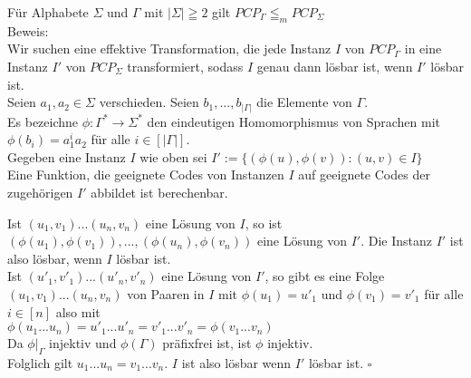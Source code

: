\begin{lemma}{}
    Für Alphabete $\Sigma$ und $\Gamma$ mit $|\Sigma| \geqq 2$ gilt $PCP_{\Gamma} \leqq_m PCP_{\Sigma}$ \\

    Beweis: \\
    Wir suchen eine effektive Transformation, die jede Instanz $I$ von $PCP_\Gamma$ in eine Instanz $I'$ von
    $PCP_\Sigma$ transformiert, sodass $I$ genau dann lösbar ist, wenn $I'$ lösbar ist. \\

    Seien $a_1,a_2 \in \Sigma$ verschieden. Seien $b_1,...,b_{|\Gamma|}$ die Elemente von $\Gamma$. \\
    Es bezeichne $\phi : \Gamma^* \rightarrow \Sigma^*$ den eindeutigen Homomorphismus von Sprachen mit
    $\phi(b_i) = a_1^i a_2$ für alle $i \in [|\Gamma|]$. \\

    Gegeben eine Instanz $I$ wie oben sei $I':=\{(\phi(u),\phi(v)):(u,v) \in I\}$ \\
    Eine Funktion, die geeignete Codes von Instanzen $I$ auf geeignete Codes der zugehörigen $I'$ abbildet
    ist berechenbar.
    
    Ist $(u_1,v_1)...(u_n,v_n)$ eine Lösung von $I$, so ist $(\phi(u_1),\phi(v_1)),...,(\phi(u_n),\phi(v_n))$
    eine Lösung von $I'$. Die Instanz $I'$ ist also lösbar, wenn $I$ lösbar ist. \\

    Ist $(u'_1,v'_1)...(u'_n,v'_n)$ eine Lösung von $I'$, so gibt es eine Folge $(u_1,v_1)...(u_n,v_n)$ von Paaren in
    $I$ mit $\phi(u_1)=u'_1$ und $\phi(v_1)=v'_1$ für alle $i \in [n]$ also mit \\
    $\phi(u_1...u_n) = u'_1...u'_n = v'_1 ...v'_n = \phi(v_1...v_n)$ \\

    Da $\phi|_\Gamma$ injektiv und $\phi(\Gamma)$ präfixfrei ist, ist $\phi$ injektiv. \\
    Folglich gilt $u_1...u_n = v_1...v_n$. $I$ ist also lösbar wenn $I'$ lösbar ist. $\square$
\end{lemma}

